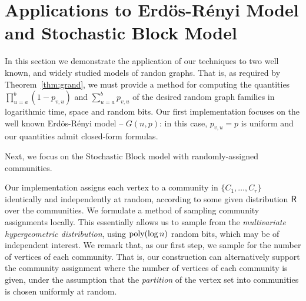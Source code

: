 \section{Applications to Erd\"{o}s-R\'{e}nyi Model and Stochastic Block Model}
\label{sec:applications}
In this section we demonstrate the application of our techniques to
two well known, and widely studied models of randon graphs. That is, as required by Theorem~\ref{thm:grand}, we must provide a method for computing the quantities $\prod_{u=a}^b (1-p_{v,u})$ and $\sum_{u=a}^b p_{v,u}$ of the desired random graph families in logarithmic time, space and random bits.
Our first implementation focuses on the well known Erd\"{o}s-R\'{e}nyi model -- $G(n,p)$: in this case, $p_{v,u} = p$ is uniform and our quantities admit closed-form formulas.

Next, we focus on the Stochastic Block model with randomly-assigned communities.
\iffalse
{\color{red}In this case, a naive solution would be to simply assign communities to contiguous blocks of indices.
In such a setting, the problem of calculating $\distr{F}(v,a,b)$, simply reduces to the $G(n,p)$ case,
with some additional case analysis to check when we are at a community boundary.
However, this setup is unrealistic,
and not particularly useful in the context of the Stochastic Block model.
In fact most algorithms operating on these graphs,
are trying to unveil the underlying community structure.}
{\color{blue} I'd say these motivations should show up in intro or preliminaries (for the full version)}
\fi
Our implementation assigns each vertex to a community in $\{C_1, \ldots, C_r\}$ identically and independently at random, according to some given distribution $\mathsf{R}$ over the communities. We formulate a method of sampling community assignments locally.
This essentially allows us to sample from the \emph{multivariate hypergeometric distribution},
using $\mathrm{poly}(\log n)$ random bits, which may be of independent interest. We remark that, as our first step, we sample for the number of vertices of each community. That is, our construction can alternatively support the community assignment where the number of vertices of each community is given, under the assumption that the \emph{partition} of the vertex set into communities is chosen uniformly at random.

